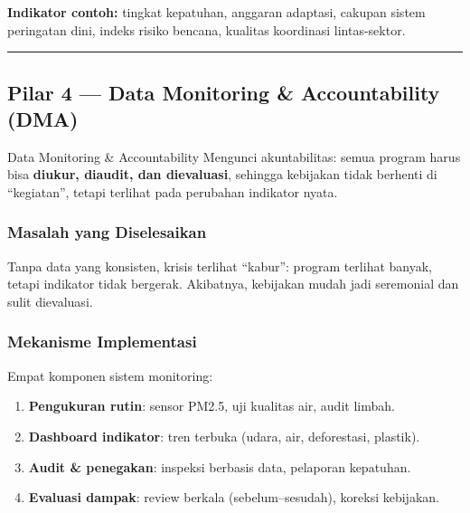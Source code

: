 \documentclass[
  letterpaper,
  DIV=11,
  numbers=noendperiod]{scrreprt}
\providecommand{\tightlist}{%
  \setlength{\itemsep}{0pt}\setlength{\parskip}{0pt}}
\begin{document}
\textbf{Indikator contoh:} tingkat kepatuhan, anggaran adaptasi, cakupan
sistem peringatan dini, indeks risiko bencana, kualitas koordinasi
lintas-sektor.

\begin{center}\rule{0.5\linewidth}{0.5pt}\end{center}

\subsection{Pilar 4 --- Data Monitoring \& Accountability
(DMA)}\label{pilar-4-data-monitoring-accountability-dma}

Data Monitoring \& Accountability Mengunci akuntabilitas: semua program
harus bisa \textbf{diukur, diaudit, dan dievaluasi}, sehingga kebijakan
tidak berhenti di ``kegiatan'', tetapi terlihat pada perubahan indikator
nyata.

\subsubsection{Masalah yang
Diselesaikan}\label{masalah-yang-diselesaikan-3}

\begin{tcolorbox}[enhanced jigsaw, colback=white, colframe=quarto-callout-warning-color-frame, left=2mm, arc=.35mm, bottomrule=.15mm, opacityback=0, opacitybacktitle=0.6, coltitle=black, toprule=.15mm, colbacktitle=quarto-callout-warning-color!10!white, breakable, titlerule=0mm, leftrule=.75mm, title=\textcolor{quarto-callout-warning-color}{\faExclamationTriangle}\hspace{0.5em}{Warning}, toptitle=1mm, bottomtitle=1mm, rightrule=.15mm]

Tanpa data yang konsisten, krisis terlihat ``kabur'': program terlihat
banyak, tetapi indikator tidak bergerak. Akibatnya, kebijakan mudah jadi
seremonial dan sulit dievaluasi.

\end{tcolorbox}

\subsubsection{Mekanisme Implementasi}\label{mekanisme-implementasi-3}

Empat komponen sistem monitoring:

\begin{enumerate}
\def\labelenumi{\arabic{enumi}.}
\tightlist
\item
  \textbf{Pengukuran rutin}: sensor PM2.5, uji kualitas air, audit
  limbah.
\item
  \textbf{Dashboard indikator}: tren terbuka (udara, air, deforestasi,
  plastik).
\item
  \textbf{Audit \& penegakan}: inspeksi berbasis data, pelaporan
  kepatuhan.
\item
  \textbf{Evaluasi dampak}: review berkala (sebelum--sesudah), koreksi
  kebijakan.
\end{enumerate}
\end{document}
